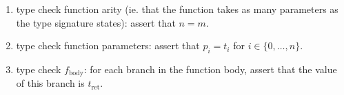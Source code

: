 \begin{enumerate}
  \item type check function arity (ie. that the function takes as many
  parameters as the type signature states): assert that $n = m$.

  \item type check function parameters: assert that $p_i = t_i$ for $i \in \{0,
    \dots, n\}$.

  \item type check $f_\text{body}$: for each branch in the function body, assert
    that the value of this branch is $t_\text{ret}$.
\end{enumerate}


\Sectend
